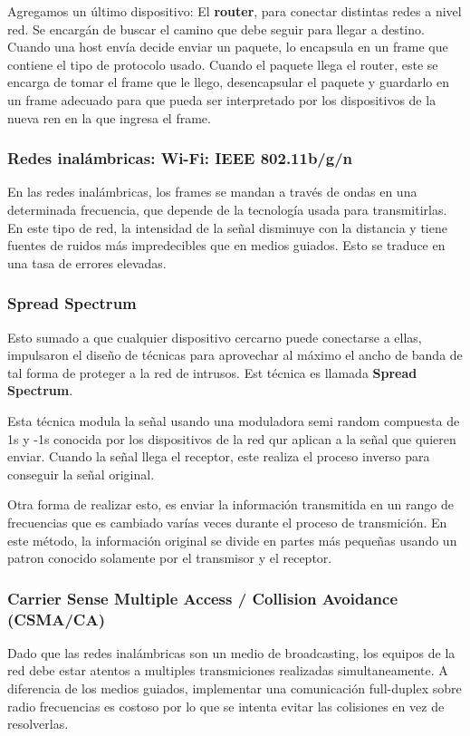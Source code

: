Agregamos un último dispositivo: El \textbf{router}, para conectar distintas redes a nivel red. Se encargán de buscar el camino que debe seguir para llegar a destino. Cuando una host envía decide enviar un paquete, lo encapsula en un frame que contiene el tipo de protocolo usado. Cuando el paquete llega el router, este se encarga de tomar el frame que le llego, desencapsular el paquete y guardarlo en un frame adecuado para que pueda ser interpretado por los dispositivos de la nueva ren en la que ingresa el frame.

\subsubsection{Redes inalámbricas: Wi-Fi: IEEE 802.11b/g/n}
En las redes inalámbricas, los frames se mandan a través de ondas en una determinada frecuencia, que depende de la tecnología usada para transmitirlas. En este tipo de red, la intensidad de la señal disminuye con la distancia y tiene fuentes de ruidos más impredecibles que en medios guiados. Esto se traduce en una tasa de errores elevadas.

\subsubsection*{Spread Spectrum}
Esto sumado a que cualquier dispositivo cercarno puede conectarse a ellas, impulsaron el diseño de técnicas para aprovechar al máximo el ancho de banda de tal forma de proteger a la red de intrusos. Est técnica es llamada \textbf{Spread Spectrum}.

Esta técnica modula la señal usando una moduladora semi random compuesta de 1s y -1s conocida por los dispositivos de la red qur aplican a la señal que quieren enviar. Cuando la señal llega el receptor, este realiza el proceso inverso para conseguir la señal original.

Otra forma de realizar esto, es enviar la información transmitida en un rango de frecuencias que es cambiado varías veces durante el proceso de transmición. En este método, la información original se divide en partes más pequeñas usando un patron conocido solamente por el transmisor y el receptor.

\subsubsection{Carrier Sense Multiple Access / Collision Avoidance (CSMA/CA)}

Dado que las redes inalámbricas son un medio de broadcasting, los equipos de la red debe estar atentos a multiples transmiciones realizadas simultaneamente. 
A diferencia de los medios guiados, implementar una comunicación full-duplex sobre radio frecuencias es costoso por lo que se intenta evitar las colisiones en vez de resolverlas.

